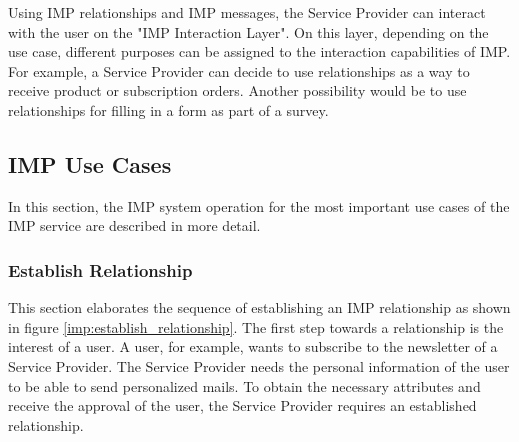 Using IMP relationships and IMP messages, the Service Provider can interact with the user on the "IMP Interaction Layer". On this layer, depending on the use case, different purposes can be assigned to the interaction capabilities of IMP. For example, a Service Provider can decide to use relationships as a way to receive product or subscription orders. Another possibility would be to use relationships for filling in a form as part of a survey.

\subsection{IMP Use Cases}

In this section, the IMP system operation for the most important use cases of the IMP service are described in more detail.

\subsubsection{Establish Relationship}

This section elaborates the sequence of establishing an IMP relationship as shown in figure \ref{imp:establish_relationship}.
The first step towards a relationship is the interest of a user. A user, for example, wants to subscribe to the newsletter of a Service Provider. The Service Provider needs the personal information of the user to be able to send personalized mails. To obtain the necessary attributes and receive the approval of the user, the Service Provider requires an established relationship.

